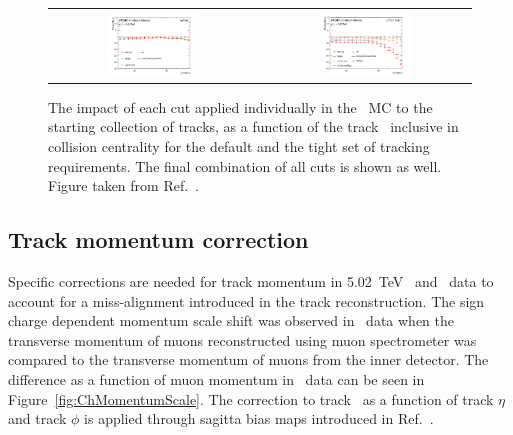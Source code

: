 \begin{figure}
\centering
\begin{tabular}{cc}
\includegraphics[width=0.45\textwidth]{figures/main/performance/PbPb_cutflow_pptight.pdf} &
\includegraphics[width=0.45\textwidth]{figures/main/performance/PbPb_cutflow_pptight_tight.pdf} \\
\end{tabular}
\caption{The impact of each cut applied individually in the \PbPb\ MC 
to the starting collection of tracks, as a function of the track \pT\ inclusive in collision centrality for the default and the tight set of tracking requirements.
The final combination of all cuts
is shown as well.
Figure taken from Ref.~\cite{Sickles:2235420}.}
\label{fig:PbPbcutflow_eta}
\end{figure}



\subsection{Track momentum correction}
\label{Sec:Trackmomentumcorrection}
Specific corrections are needed for track momentum in 5.02~TeV \pp\ and \PbPb\ data to account for a miss-alignment introduced in the track reconstruction.
The sign charge dependent momentum scale shift was observed in \pp\ data when the transverse momentum of muons reconstructed using muon spectrometer was compared to the transverse momentum of muons from the inner detector.
The difference as a function of muon momentum in \pbpb\ data can be seen in Figure~\ref{fig:ChMomentumScale}.
The correction to track \pt\ as a function of track $\eta$ and track $\phi$ is applied through sagitta bias maps introduced in Ref.~\cite{TrackingRec}.

